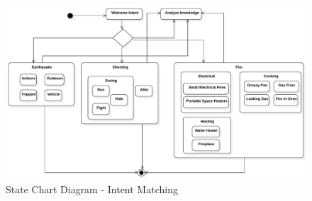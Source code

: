 \documentclass{scrreprt}
\begin{document}
\begin{figure}[ht!]
    \centering
    \includegraphics[angle=90, height=.95\textheight]{imgs/StatechartDiagram1.pdf}
    \caption{State Chart Diagram - Intent Matching}
    \label{fig:statechartdiagram1}
\end{figure}












\end{document}
